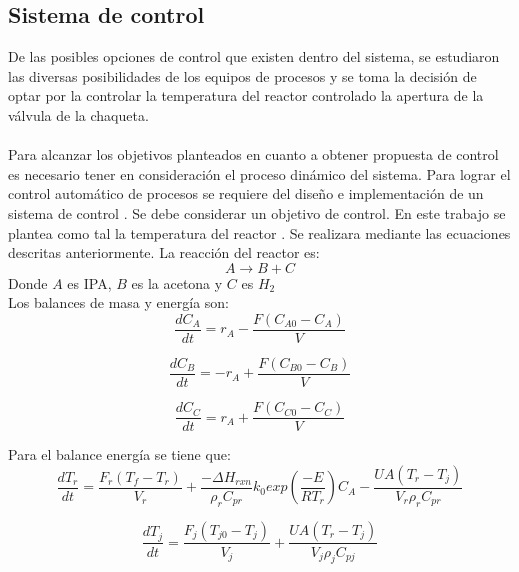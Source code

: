     \subsection*{Sistema de control}

    De las posibles opciones de control que existen dentro del sistema, se estudiaron las diversas posibilidades de los equipos de procesos y se toma la decisión de optar por la controlar la temperatura del reactor controlado la apertura de la válvula de  la chaqueta.
    \paragraph{}
    Para alcanzar los objetivos planteados en cuanto a obtener propuesta de control  es necesario tener en consideración el proceso dinámico del sistema. Para lograr el control automático de procesos se requiere del diseño e implementación de un
    sistema de control \cite{smith1991control}. Se debe considerar un objetivo de control. En este trabajo se plantea  como tal la temperatura del reactor . Se realizara mediante las ecuaciones descritas  anteriormente.
    La  reacción  del reactor  es:\\
                $$ A \rightarrow B +    C $$
    Donde $A$ es IPA, $B$ es la acetona  y $C$ es $H_2$\\
    Los balances de masa y energía  son:\\
        \begin{equation}
            \dfrac{dC_A}{dt}= r_A -\dfrac{F (C_{A0}-C_A)}{V}
            \label{balanceA}
        \end{equation}

        \begin{equation}
            \dfrac{dC_B}{dt}= -r_A +\dfrac{F(C_{B0}- C_B)}{V}
        \end{equation}

        \begin{equation}
            \dfrac{dC_C}{dt}= r_A +\dfrac{F(C_{C0} - C_C)}{V}
        \end{equation}

    Para el balance energía se tiene que:
        \begin{equation}
            \dfrac{dT_r}{dt} = \dfrac{F_r(T_f - T_r)}{V_r} + \dfrac{-\Delta H_{rxn}}{\rho_r C_{pr}}k_0exp\left(\frac{-E}{RT_r}\right)C_A -\dfrac{UA(T_r-T_j)}{V_r\rho_r C_{pr}}
            \label{energia}
        \end{equation}

        \begin{equation}
            \dfrac{dT_j}{dt} = \dfrac{F_j(T_{j0} - T_j)}{V_j}  +\dfrac{UA(T_r-T_j)}{V_j\rho_j C_{pj}}
            \label{energiachaqueta}
        \end{equation}

